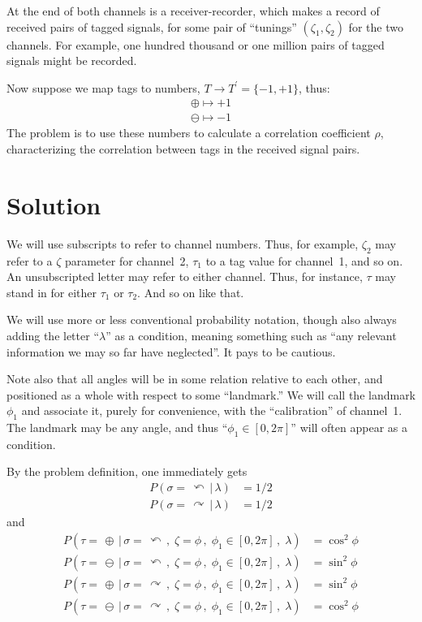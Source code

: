 \documentclass[9pt,technote]{IEEEtran}
\begin{document}
At the end of both channels is a receiver-recorder, which makes a
record of received pairs of tagged signals, for some pair of
``tunings'' $(\zeta_1,\zeta_2)$ for the two channels. For example, one
hundred thousand or one million pairs of tagged signals might be
recorded.

Now suppose we map tags to numbers, $T\to T^{\prime}=\{-1,+1\}$, thus:
\begin{align}
  \oplus \mapsto +1 \\
  \ominus \mapsto -1
\end{align}
The problem is to use these numbers to calculate a correlation
coefficient $\rho$, characterizing the correlation between tags in the
received signal pairs.

\section{Solution}

We will use subscripts to refer to channel numbers. Thus, for example,
$\zeta_2$ may refer to a $\zeta$ parameter for channel~2, $\tau_1$ to
a tag value for channel~1, and so on. An unsubscripted letter may
refer to either channel. Thus, for instance, $\tau$ may stand in for
either $\tau_1$ or $\tau_2$. And so on like that.

We will use more or less conventional probability notation, though
also always adding the letter ``$\lambda$'' as a condition, meaning
something such as ``any relevant information we may so far have
neglected''. It pays to be cautious.

Note also that all angles will be in some relation relative to each
other, and positioned as a whole with respect to some ``landmark.'' We
will call the landmark $\phi_1$ and associate it, purely for
convenience, with the ``calibration'' of channel~1. The landmark may
be any angle, and thus ``$\phi_1\in[0,2\pi]$'' will often appear as a
condition.

By the problem definition, one immediately gets
\begin{align}
  P(\sigma=\,\curvearrowleft \,|\, \lambda) &= 1\!/2 \\
  P(\sigma=\,\curvearrowright \,|\, \lambda) &= 1\!/2
\end{align}
and
\begin{align}
  P(\tau=\,\oplus \,|\, \sigma=\,\curvearrowleft\,,\; \zeta=\phi\,,\; \phi_1\in[0,2\pi]\,,\; \lambda) &= \cos^2 \phi \\
  P(\tau=\,\ominus \,|\, \sigma=\,\curvearrowleft\,,\; \zeta=\phi\,,\; \phi_1\in[0,2\pi]\,,\; \lambda) &= \sin^2 \phi \\
  P(\tau=\,\oplus \,|\, \sigma=\,\curvearrowright\,,\; \zeta=\phi\,,\; \phi_1\in[0,2\pi]\,,\; \lambda) &= \sin^2 \phi \\
  P(\tau=\,\ominus \,|\, \sigma=\,\curvearrowright\,,\; \zeta=\phi\,,\; \phi_1\in[0,2\pi]\,,\; \lambda) &= \cos^2 \phi
\end{align}
\end{document}
